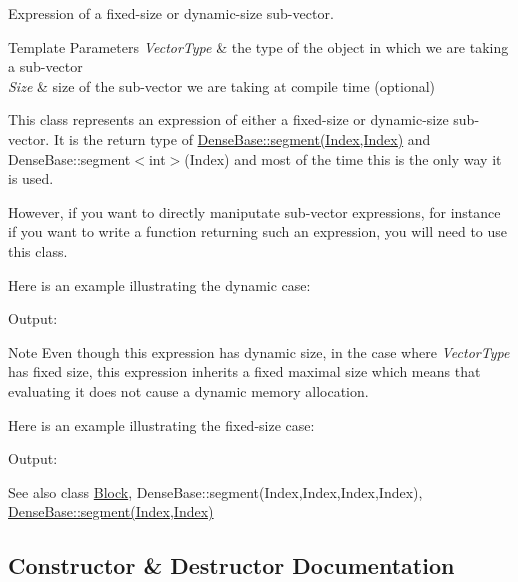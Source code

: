 Expression of a fixed-\/size or dynamic-\/size sub-\/vector. 


\begin{DoxyTemplParams}{Template Parameters}
{\em Vector\+Type} & the type of the object in which we are taking a sub-\/vector \\
\hline
{\em Size} & size of the sub-\/vector we are taking at compile time (optional)\\
\hline
\end{DoxyTemplParams}
This class represents an expression of either a fixed-\/size or dynamic-\/size sub-\/vector. It is the return type of \mbox{\hyperlink{class_eigen_1_1_dense_base_a12704b924ecc7161a38b123901e9cc9e}{Dense\+Base\+::segment(\+Index,\+Index)}} and Dense\+Base\+::segment$<$int$>$(\+Index) and most of the time this is the only way it is used.

However, if you want to directly maniputate sub-\/vector expressions, for instance if you want to write a function returning such an expression, you will need to use this class.

Here is an example illustrating the dynamic case\+: 
\begin{DoxyCodeInclude}{0}
\end{DoxyCodeInclude}
 Output\+: 
\begin{DoxyVerbInclude}
\end{DoxyVerbInclude}


\begin{DoxyNote}{Note}
Even though this expression has dynamic size, in the case where {\itshape Vector\+Type} has fixed size, this expression inherits a fixed maximal size which means that evaluating it does not cause a dynamic memory allocation.
\end{DoxyNote}
Here is an example illustrating the fixed-\/size case\+: 
\begin{DoxyCodeInclude}{0}
\end{DoxyCodeInclude}
 Output\+: 
\begin{DoxyVerbInclude}
\end{DoxyVerbInclude}


\begin{DoxySeeAlso}{See also}
class \mbox{\hyperlink{class_eigen_1_1_block}{Block}}, Dense\+Base\+::segment(\+Index,\+Index,\+Index,\+Index), \mbox{\hyperlink{class_eigen_1_1_dense_base_a12704b924ecc7161a38b123901e9cc9e}{Dense\+Base\+::segment(\+Index,\+Index)}} 
\end{DoxySeeAlso}


\subsection{Constructor \& Destructor Documentation}
\mbox{\label{class_eigen_1_1_vector_block_a4bd5eb61b2c420218269a111d717dbb7}} 
